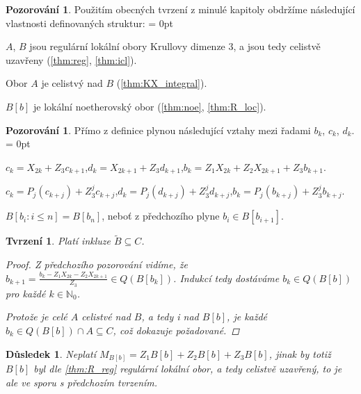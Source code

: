 \documentclass[11pt,a4paper]{article}
\newcommand\m[1]{\mathbb { #1 }} %
\newcommand\N{\m N}
\newenvironment{items}{%
	\itemize
	\itemsep = 0pt%
}{%
	\enditemize
}
\newcounter{numb}
\theoremstyle{definition}
\newtheorem{pozorovani}[numb]{Pozorování}
\theoremstyle{plain}
\newtheorem{tvrzeni}[numb]{Tvrzení}
\newtheorem{dusledek}[numb]{Důsledek}
\begin{document}
\begin{pozorovani}
	Použitím obecných tvrzení z minulé kapitoly obdržíme následující vlastnosti definovaných struktur:
	\begin{items}
		\item $A$, $B$ jsou regulární lokální obory Krullovy dimenze $3$, a jsou tedy celistvě uzavřeny (\ref{thm:reg}, \ref{thm:icl}).
		\item Obor $A$ je celistvý nad $B$ (\ref{thm:KX_integral}).
		\item $B[b]$ je lokální noetherovský obor (\ref{thm:noe}, \ref{thm:R_loc}).
	\end{items}
\end{pozorovani}

\begin{pozorovani} Přímo z definice plynou následující vztahy mezi řadami $b_k$, $c_k$, $d_k$.
	\begin{items}
		\item $c_k = X_{2k} + Z_3 c_{k + 1}$,\quad $d_k = X_{2k + 1} + Z_3 d_{k + 1}$,\quad $b_k = Z_1 X_{2k} + Z_2 X_{2k + 1} + Z_3 b_{k + 1}$.
		\item $c_k = P_j(c_{k + j}) + Z_3^j c_{k + j}$,\quad $d_k = P_j(d_{k + j}) + Z_3^j d_{k + j}$,\quad $b_k = P_j(b_{k + j}) + Z_3^j b_{k +j}$.
		\item $B[b_i: i \leq n] = B[b_n]$, neboť z předchozího plyne $b_i \in B[b_{i + 1}]$.
	\end{items}
\end{pozorovani}

\begin{tvrzeni}
	Platí inkluze $\tilde{B} \subseteq C$.

	\begin{proof}
		Z předchozího pozorování vidíme, že $b_{k + 1} = \frac{b_k - Z_1 X_{2k} - Z_2 X_{2k + 1}}{Z_3} \in Q(B[b_k])$. Indukcí tedy dostáváme $b_k \in Q(B[b])$ pro každé $k \in \N_0$.

		Protože je celé $A$ celistvé nad $B$, a tedy i nad $B[b]$, je každé $b_k \in Q(B[b]) \cap A \subseteq C$, což dokazuje požadované.
	\end{proof}
\end{tvrzeni}

\begin{dusledek}
	Neplatí $M_{B[b]} = Z_1 B[b] + Z_2 B[b] + Z_3 B[b]$, jinak by totiž $B[b]$ byl dle \ref{thm:R_reg} regulární lokální obor, a tedy celistvě uzavřený, to je ale ve sporu s předchozím tvrzením.
\end{dusledek}
\end{document}
